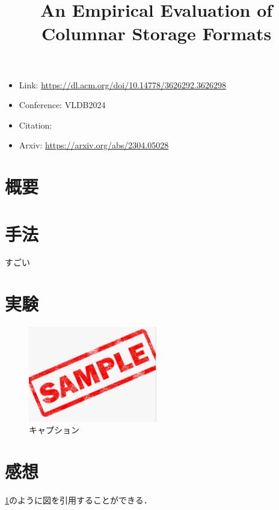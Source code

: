\documentclass[uplatex]{jsarticle}
\title{An Empirical Evaluation of Columnar Storage Formats}
\author{\empty}
\date{\empty}
\theoremstyle{remark}
\begin{document}
\maketitle

\begin{itemize}
    \item Link: \url{https://dl.acm.org/doi/10.14778/3626292.3626298}
    \item Conference: VLDB2024
    \item Citation: \cite{columnar_storage_formats}
    \item Arxiv: \url{https://arxiv.org/abs/2304.05028}
\end{itemize}

\section{概要}

\section{手法}
\cite{mypaper}すごい
\section{実験}

\begin{figure}
  \centering
  \includegraphics[width=0.5\textwidth]{img/image.png}
  \caption{キャプション}
  \label{fig:template}
\end{figure}

\section{感想}
\ref{fig:template}のように図を引用することができる．




\end{document}
